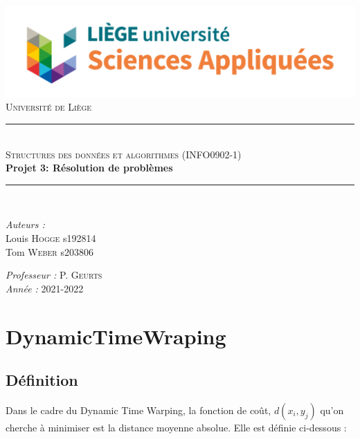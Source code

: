 \documentclass[a4paper, 11pt]{article}
\newcommand{\HRule}{\rule{\linewidth}{0.5mm}}
\begin{document}
\begin{titlepage}

\begin{center}
\includegraphics[scale = 0.35]{logo.jpg}\\
\vspace{1cm}
\textsc{\huge Université de Liège}\\[1.2cm]
\HRule \\[1cm]
\textsc{\LARGE Structures des données et algorithmes (INFO0902-1) }\\[1cm]
{\Huge \bfseries Projet 3: Résolution de problèmes}\\[1.4cm] 
\HRule \\[1cm]
\end{center}

\begin{minipage}{0.45\linewidth}
      \begin{flushleft} \large
        \emph{Auteurs : } \\
        Louis \textsc{Hogge}  s192814\\
        Tom \textsc{Weber}  s203806
      \end{flushleft}
\end{minipage}
\hfill
\begin{minipage}{0.45\linewidth}
      \begin{flushright} \large
        \emph{Professeur : } P. \textsc{Geurts}\\
        \emph{Année : } 2021-2022 
      \end{flushright}
\end{minipage}

\end{titlepage}

\newpage

\section{DynamicTimeWraping}
\subsection{Définition}
Dans le cadre du Dynamic Time Warping, la fonction de coût, $d(x_i , y_j)$ qu'on cherche à minimiser est la distance moyenne absolue. Elle est définie ci-dessous :
\end{document}
